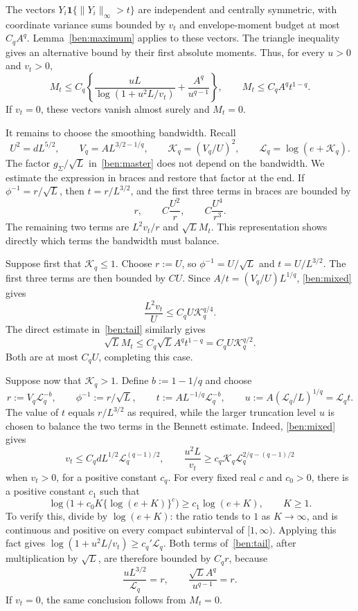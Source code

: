 \documentclass[11pt,letterpaper]{article}
\theoremstyle{remark}
\newcommand{\ind}{\mathbf 1}
\begin{document}
The vectors $Y_i\ind\{\|Y_i\|_\infty>t\}$ are independent
and centrally symmetric, with coordinate variance sums bounded
by $v_t$ and envelope-moment budget at most $C_qA^q$.
Lemma~\ref{ben:maximum} applies to these vectors. The triangle
inequality gives an alternative bound by their first absolute
moments. Thus, for every $u>0$ and $v_t>0$,
\begin{equation}
 M_t\le C_q\left\{\frac{uL}{\log(1+u^2L/v_t)}
                      +\frac{A^q}{u^{q-1}}\right\},
 \qquad M_t\le C_qA^qt^{1-q}.
 \label{ben:tail}
\end{equation}
If $v_t=0$, these vectors vanish almost surely and $M_t=0$.

It remains to choose the smoothing bandwidth. Recall
\[
 U^2=dL^{5/2},\qquad V_q=AL^{3/2-1/q},\qquad
 \mathcal K_q=(V_q/U)^2,\qquad
 \mathcal L_q=\log(e+\mathcal K_q).
\]
The factor $g_\Sigma/\sqrt L$ in~\eqref{ben:master} does not
depend on the bandwidth. We estimate the expression in braces
and restore that factor at the end. If
$\phi^{-1}=r/\sqrt L$, then $t=r/L^{3/2}$, and the first
three terms in braces are bounded by
\[
 r,\qquad C\frac{U^2}{r},\qquad C\frac{U^4}{r^3}.
\]
The remaining two terms are $L^2v_t/r$ and $\sqrt L M_t$.
This representation shows directly which terms the bandwidth
must balance.

Suppose first that $\mathcal K_q\le1$. Choose $r:=U$, so
$\phi^{-1}=U/\sqrt L$ and $t=U/L^{3/2}$. The first three
terms are then bounded by $CU$. Since
$A/t=(V_q/U)L^{1/q}$, \eqref{ben:mixed} gives
\[
 \frac{L^2v_t}{U}\le C_qU\mathcal K_q^{q/4}.
\]
The direct estimate in~\eqref{ben:tail} similarly gives
\[
 \sqrt L M_t\le C_q\sqrt L A^qt^{1-q}
                 =C_qU\mathcal K_q^{q/2}.
\]
Both are at most $C_qU$, completing this case.

Suppose now that $\mathcal K_q>1$. Define $b:=1-1/q$ and choose
\[
 r:=V_q\mathcal L_q^{-b},\qquad
 \phi^{-1}:=r/\sqrt L,\qquad
 t:=AL^{-1/q}\mathcal L_q^{-b},\qquad
 u:=A(\mathcal L_q/L)^{1/q}=\mathcal L_q t.
\]
The value of $t$ equals $r/L^{3/2}$ as required, while the
larger truncation level $u$ is chosen to balance the two terms
in the Bennett estimate. Indeed, \eqref{ben:mixed} gives
\[
 v_t\le C_qdL^{1/2}\mathcal L_q^{(q-1)/2},\qquad
 \frac{u^2L}{v_t}
 \ge c_q\mathcal K_q\mathcal L_q^{2/q-(q-1)/2}
\]
when $v_t>0$, for a positive constant $c_q$.
For every fixed real $c$ and $c_0>0$, there is a positive
constant $c_1$ such that
\[
 \log\bigl(1+c_0K\{\log(e+K)\}^c\bigr)
 \ge c_1\log(e+K),\qquad K\ge1.
\]
To verify this, divide by $\log(e+K)$: the ratio tends to $1$
as $K\to\infty$, and is continuous and positive on every
compact subinterval of $[1,\infty)$. Applying this fact gives
$\log(1+u^2L/v_t)\ge c_q'\mathcal L_q$.
Both terms of~\eqref{ben:tail}, after multiplication by
$\sqrt L$, are therefore bounded by $C_qr$, because
\[
 \frac{uL^{3/2}}{\mathcal L_q}=r,
 \qquad \frac{\sqrt L A^q}{u^{q-1}}=r.
\]
If $v_t=0$, the same conclusion follows from $M_t=0$.
\end{document}
